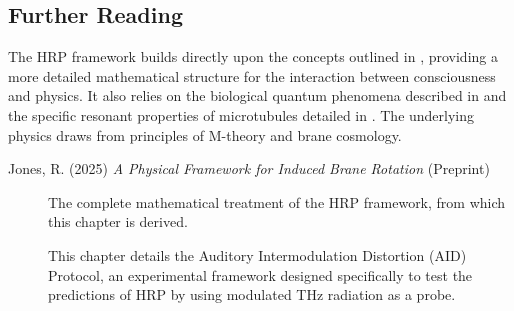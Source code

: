 \begin{importantbox}
\section*{Further Reading}
The HRP framework builds directly upon the concepts outlined in , providing a more detailed mathematical structure for the interaction between consciousness and physics. It also relies on the biological quantum phenomena described in  and the specific resonant properties of microtubules detailed in . The underlying physics draws from principles of M-theory and brane cosmology.

\begin{description}
    \item[Jones, R. (2025) \textit{A Physical Framework for Induced Brane Rotation} (Preprint)] The complete mathematical treatment of the HRP framework, from which this chapter is derived.
\end{description}

\begin{description}
    \item[] This chapter details the Auditory Intermodulation Distortion (AID) Protocol, an experimental framework designed specifically to test the predictions of HRP by using modulated THz radiation as a probe.
\end{description}
\end{importantbox}